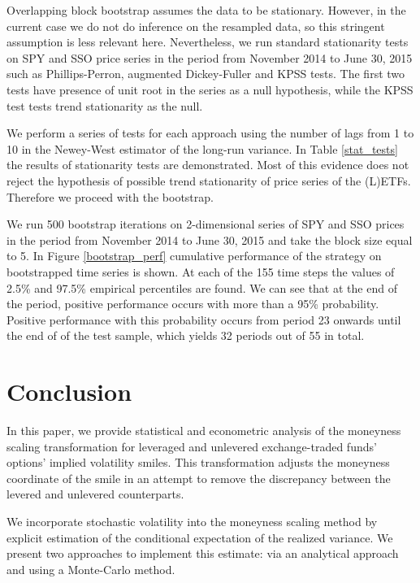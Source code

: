 \documentclass{rQUF2e}
\theoremstyle{plain}
\theoremstyle{definition}
\begin{document}
	Overlapping block bootstrap assumes the data to be stationary. However, in the current case we do not do inference on the resampled data, so this stringent assumption is less relevant here. Nevertheless, we run standard stationarity tests on SPY and SSO price series in the period from November 2014 to June 30, 2015 such as Phillips-Perron, augmented Dickey-Fuller and KPSS tests. The first two tests have presence of unit root in the series as a null hypothesis, while the KPSS test tests trend stationarity as the null. 
	
	We perform a series of tests for each approach using the number of lags from 1 to 10 in the Newey-West estimator of the long-run variance. In Table \ref{stat_tests} the results of stationarity tests are demonstrated. Most of this evidence does not reject the hypothesis of possible trend stationarity of price series of the (L)ETFs. Therefore we proceed with the bootstrap.
	
	We run 500 bootstrap iterations on 2-dimensional series of SPY and SSO prices in the period from November 2014 to June 30, 2015 and take the block size equal to 5. In Figure \ref{bootstrap_perf} cumulative performance of the strategy on bootstrapped time series is shown. At each of the 155 time steps the values of 2.5\% and 97.5\% empirical percentiles are found. We can see that at the end of the period, positive performance occurs with more than a 95\% probability. Positive performance with this probability occurs from period 23 onwards until the end of of the test sample, which yields 32 periods out of 55 in total.
	
	
	
	\section{Conclusion}
	
	In this paper, we provide statistical and econometric analysis of the moneyness scaling transformation for leveraged and unlevered exchange-traded funds' options' implied volatility smiles. This transformation adjusts the moneyness coordinate of the smile in an attempt to remove the discrepancy between the levered and unlevered counterparts. 
	
	We incorporate stochastic volatility into the moneyness scaling method by explicit estimation of the conditional expectation of the realized variance. We present two approaches to implement this estimate: via an analytical approach and using a Monte-Carlo method.
	
\end{document}
